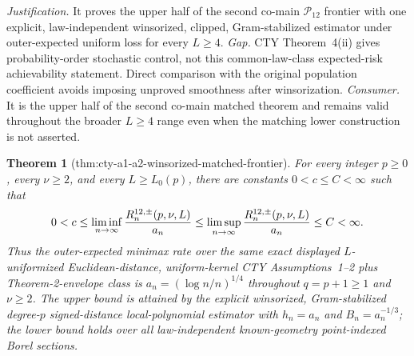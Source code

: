 \documentclass{article}
\newtheorem{theorem}{Theorem}
\begin{document}
\par\smallskip\noindent \textit{Justification.} It proves the upper half of the second co-main \(\mathcal P_{12}\) frontier with one explicit, law-independent winsorized, clipped, Gram-stabilized estimator under outer-expected uniform loss for every \(L\geq4\). \textit{Gap.} CTY Theorem~4(ii) gives probability-order stochastic control, not this common-law-class expected-risk achievability statement.  Direct comparison with the original population coefficient avoids imposing unproved smoothness after winsorization. \textit{Consumer.} It is the upper half of the second co-main matched theorem and remains valid throughout the broader \(L\geq4\) range even when the matching lower construction is not asserted.

\begin{theorem}[thm:cty-a1-a2-winsorized-matched-frontier]\label{thm:cty-a1-a2-winsorized-matched-frontier}
For every integer \(p\geq0\), every \(\nu\geq2\), and every \(L\geq L_0(p)\), there are constants \(0<c\leq C<\infty\) such that
\[
 0<c\leq\liminf_{n\to\infty}{R^{12,\pm}_n(p,\nu,L)\over a_n}
 \leq\limsup_{n\to\infty}{R^{12,\pm}_n(p,\nu,L)\over a_n}\leq C<\infty.
\]
Thus the outer-expected minimax rate over the same exact displayed \(L\)-uniformized Euclidean-distance, uniform-kernel CTY Assumptions~1--2 plus Theorem-2-envelope class is \(a_n=(\log n/n)^{1/4}\) throughout \(q=p+1\geq1\) and \(\nu\geq2\).  The upper bound is attained by the explicit winsorized, Gram-stabilized degree-\(p\) signed-distance local-polynomial estimator with \(h_n=a_n\) and \(B_n=a_n^{-1/3}\); the lower bound holds over all law-independent known-geometry point-indexed Borel sections.
\end{theorem}
\end{document}
